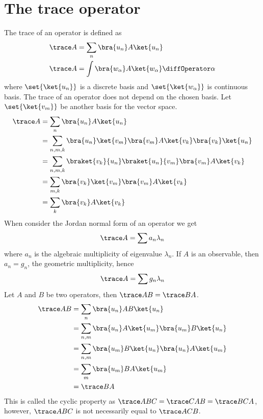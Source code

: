 \section{The trace operator}
The trace of an operator is defined as 
\begin{align*}
    \trace A &= \sum_{n} \bra{u_n} A \ket{u_n}\\
    \trace A &= \int \bra{w_{\alpha}} A \ket{w_{\alpha}} \diffOperator \alpha 
\end{align*}
where \(\set{\ket{u_n}}\) is a discrete basis and \(\set{\ket{w_{\alpha}}}\) is continuous basis. The trace of an operator does not depend on the chosen basis. Let \(\set{\ket{v_m}}\) be another basis for the vector space.
\begin{align*}
    \trace A &= \sum_{n} \bra{u_n} A \ket{u_n}\\
    &= \sum_{n,m,k} \bra{u_n} \ket{v_m} \bra{v_m} A \ket{v_k} \bra{v_k}\ket{u_n}\\
    &= \sum_{n,m,k} \braket{v_k}{u_n} \braket{u_n}{v_m} \bra{v_m} A \ket{v_k}\\
    &= \sum_{m,k}\bra{v_k} \ket{v_m}\bra{v_m} A \ket{v_k}\\
    &= \sum_{k} \bra{v_k} A \ket{v_k}
\end{align*}
When consider the Jordan normal form of an operator we get 
\begin{equation*}
    \trace A = \sum a_n \lambda_n
\end{equation*}
where \(a_n\) is the algebraic multiplicity of eigenvalue \(\lambda_n\). If \(A\) is an observable, then \(a_n = g_n\), the geometric multiplicity, hence 
\begin{equation*}
    \trace A = \sum g_n \lambda_n
\end{equation*}
Let \(A\) and \(B\) be two operators, then \(\trace AB = \trace BA\).
\begin{align*}
    \trace AB &= \sum_{n} \bra{u_n} AB \ket{u_n}\\
    &= \sum_{n,m}  \bra{u_n} A\ket{u_m}\bra{u_m}B \ket{u_n}\\
    &= \sum_{n,m}  \bra{u_m}B \ket{u_n}\bra{u_n} A\ket{u_m}\\
    &= \sum_{m}  \bra{u_m}B A\ket{u_m}\\
    &= \trace BA
\end{align*}
This is called the cyclic property as \(\trace ABC = \trace CAB = \trace BCA\), however, \(\trace ABC\) is not necessarily equal to \(\trace ACB\).

